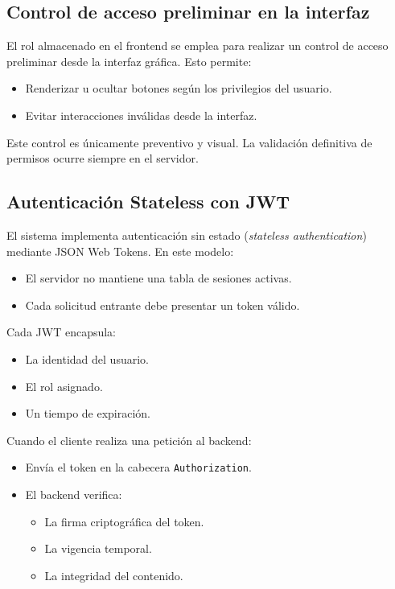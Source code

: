 \documentclass[12pt,letterpaper]{article}
\begin{document}
\subsection*{Control de acceso preliminar en la interfaz}

El rol almacenado en el frontend se emplea para realizar un control de acceso preliminar desde la interfaz gráfica. Esto permite:

\begin{itemize}
    \item Renderizar u ocultar botones según los privilegios del usuario.
    \item Evitar interacciones inválidas desde la interfaz.
\end{itemize}

Este control es únicamente preventivo y visual. La validación definitiva de permisos ocurre siempre en el servidor.

\subsection*{Autenticación Stateless con JWT}

El sistema implementa autenticación sin estado (\textit{stateless authentication}) mediante JSON Web Tokens. En este modelo:

\begin{itemize}
    \item El servidor no mantiene una tabla de sesiones activas.
    \item Cada solicitud entrante debe presentar un token válido.
\end{itemize}

Cada JWT encapsula:

\begin{itemize}
    \item La identidad del usuario.
    \item El rol asignado.
    \item Un tiempo de expiración.
\end{itemize}

Cuando el cliente realiza una petición al backend:

\begin{itemize}
    \item Envía el token en la cabecera \texttt{Authorization}.
    \item El backend verifica:
    \begin{itemize}
        \item La firma criptográfica del token.
        \item La vigencia temporal.
        \item La integridad del contenido.
    \end{itemize}
\end{itemize}
\end{document}
